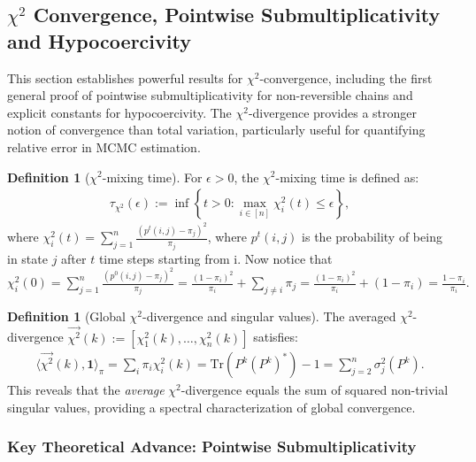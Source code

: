 \documentclass[preprint]{imsart}
\theoremstyle{plain}
\theoremstyle{definition}
\newtheorem{definition}[theorem]{Definition}
\begin{document}
\subsection{$\chi^{2}$ Convergence, Pointwise Submultiplicativity and Hypocoercivity}

This section establishes powerful results for $\chi^2$-convergence, including the first general proof of pointwise submultiplicativity for non-reversible chains and explicit constants for hypocoercivity. The $\chi^2$-divergence provides a stronger notion of convergence than total variation, particularly useful for quantifying relative error in MCMC estimation.

\begin{definition}[$\chi^2$-mixing time]
    For $\epsilon > 0$, the $\chi^2$-mixing time is defined as:
    \begin{align}
        \tau_{\chi^{2}}(\epsilon):=\inf\left\{t>0: \max_{i \in [n]} \chi_{i}^{2}(t) \leq \epsilon \right\},
    \end{align}
    where $\chi_{i}^{2}(t)=\sum_{j=1}^{n}\frac{(p^{t}(i,j)-\pi_{j})^{2}}{\pi_{j}}$, where $p^{t}(i,j)$ is the probability of being in state $j$ after $t$ time steps starting from i. Now notice that $\chi_{i}^{2}(0)=\sum_{j=1}^{n}\frac{(p^{0}(i,j)-\pi_{j})^{2}}{\pi_{j}}=\frac{(1-\pi_{i})^{2}}{\pi_{i}}+\sum_{j \neq i}\pi_{j}=\frac{(1-\pi_{i})^{2}}{\pi_{i}}+(1-\pi_{i})=\frac{1-\pi_{i}}{\pi_{i}}.$ 
\end{definition}

\begin{definition}[Global $\chi^2$-divergence and singular values]
    The averaged $\chi^2$-divergence $\vec{\chi^{2}}(k):=[\chi_{1}^{2}(k),\ldots,\chi_{n}^{2}(k)]$ satisfies:
    \begin{align}
        \langle \vec{\chi^{2}}(k),\mathbf{1}\rangle_{\pi} = \sum_{i}\pi_{i}\chi_{i}^{2}(k) = \mathrm{Tr}(P^{k}(P^{k})^{*})-1 = \sum_{j=2}^{n}\sigma_{j}^{2}(P^{k}).
    \end{align}
    This reveals that the \emph{average} $\chi^2$-divergence equals the sum of squared non-trivial singular values, providing a spectral characterization of global convergence.
\end{definition}

\subsubsection*{Key Theoretical Advance: Pointwise Submultiplicativity}
\end{document}
